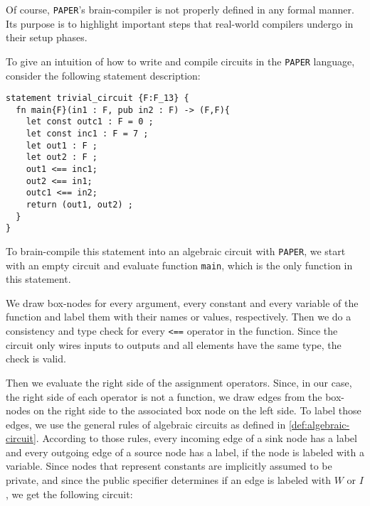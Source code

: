 Of course, \texttt{PAPER}'s brain-compiler is not properly defined in any formal manner. Its purpose is to highlight important steps that real-world compilers undergo in their setup phases. 
\begin{example}\label{ex:trivial-circuit} To give an intuition of how to write and compile circuits in the \texttt{PAPER} language, consider the following statement description:
\begin{lstlisting}
statement trivial_circuit {F:F_13} {
  fn main{F}(in1 : F, pub in2 : F) -> (F,F){
    let const outc1 : F = 0 ;   
    let const inc1 : F = 7 ;
    let out1 : F ;
    let out2 : F ;
    out1 <== inc1;
    out2 <== in1;
    outc1 <== in2;
    return (out1, out2) ;
  }
}
\end{lstlisting} 
To brain-compile this statement into an algebraic circuit with \texttt{PAPER}, we start with an empty circuit and evaluate function \texttt{main}, which is the only function in this statement. 

We draw box-nodes for every argument, every constant and every variable of the function and label them with their names or values, respectively.  Then we do a consistency and type check for every \texttt{<==} operator in the function. Since the circuit only wires inputs to outputs and all elements have the same type, the check is valid.

Then we evaluate the right side of the assignment operators. Since, in our case, the right side of each operator is not a function, we draw edges from the box-nodes on the right side to the associated box node on the left side. To label those edges, we use the general rules of algebraic circuits as defined in \ref{def:algebraic-circuit}. According to those rules, every incoming edge of a sink node has a label and every outgoing edge of a source node has a label, if the node is labeled with a variable. Since nodes that represent constants are implicitly assumed to be private, and since the public specifier determines if an edge is labeled with $W$ or $I$, we get the following circuit:
\begin{center}
\end{center}
\end{example}

